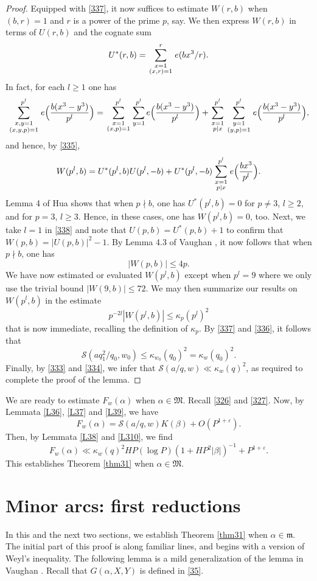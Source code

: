 \documentclass[reqno]{amsart}
\newcommand{\f}[2]{\frac{#1}{#2}}
\newcommand{\multsum}[2]{\sum_{{\scriptstyle #1}\atop {\scriptstyle #2}}}
\numberwithin{equation}{section}
\begin{document}
\begin{proof}
Equipped with \eqref{337}, it now suffices to estimate $W(r,b)$ when $(b,r)=1$ and $r$ is a power of the prime $p$, say. We then express $W(r,b)$ in terms of $U(r,b)$ and the cognate sum
$$ U^*(r,b) = \multsum{x=1}{(x,r)=1}^r e(bx^3/r). $$
In fact, for each $l\ge 1$ one has
$$  \multsum{x,y=1}{(x,y,p)=1}^{p^l} e\Big(\frac{b(x^3-y^3)}{p^l}\Big) = \multsum{x=1}{(x,p)=1}^{p^l} \sum_{y=1}^{p^l} e\Big(\frac{b(x^3-y^3)}{p^l}\Big) + \multsum{x=1}{p\mid x}^{p^l} \multsum{y=1}{(y,p)=1}^{p^l} e\Big(\frac{b(x^3-y^3)}{p^l}\Big), $$
and hence, by \eqref{335},
\begin{equation}\label{338} W(p^l,b) = U^*(p^l,b)U(p^l,-b) +U^*(p^l,-b) \multsum{x=1}{p\mid x}^{p^l}
e\Big(\f{bx^3}{p^l}\Big). \end{equation}
Lemma 4 of Hua \cite{H1} shows that when $p\nmid b$, one has $U^*(p^l,b)=0$ for $p\neq 3$, $l\ge 2$, and for $p=3$, $l\ge 3$. Hence, in these cases, one has $W(p^l,b)=0$, too. 
Next, we take $l=1$ in \eqref{338} and note that $U(p,b) = U^*(p,b)+1$ to confirm that $W(p,b)=|U(p,b)|^2 -1$. By Lemma 4.3 of Vaughan \cite{hlm}, it now follows that when $p\nmid b$, one has
$$ |W(p,b)| \le 4p. $$
We have now estimated or evaluated $W(p^l,b)$ except when $p^l=9$ where we only use the trivial bound $|W(9,b)|\le 72$. We may then summarize our results on $W(p^l,b)$ in the estimate
$$ p^{-2l} |W(p^l,b)| \le \kappa_p(p^l)^2 $$
that is now immediate, recalling the definition of $\kappa_p$. By \eqref{337} and \eqref{336}, it follows that
$$   \mathscr S(aq_1^2/q_0,w_0) \le \kappa_{w_0}(q_0)^2 = \kappa_w(q_0)^2. $$
Finally, by \eqref{333} and \eqref{334}, we infer that
$ \mathscr S(a/q,w) \ll \kappa_w(q)^2$, as required to complete the proof of the lemma.
\end{proof}

We are ready to estimate $F_w(\alpha)$ when $\alpha\in\mathfrak M$. Recall \eqref{326} and \eqref{327}. Now, by Lemmata \ref{L36}, \ref{L37} and \ref{L39}, we have
$$ F_w(\alpha) = \mathscr S(a/q,w)K(\beta) +O(P^{1+\varepsilon}). $$
Then, by Lemmata \ref{L38} and \ref{L310}, we find
$$ F_w(\alpha) \ll \kappa_w(q)^2 HP (\log P) (1+HP^2|\beta|)^{-1} + P^{1+\varepsilon}. $$
This establishes Theorem \ref{thm31} when $\alpha\in \mathfrak M$.




\section{Minor arcs: first reductions}

In this and the next two sections, we establish Theorem \ref{thm31} when \(\alpha \in \mathfrak m\). The initial part of this proof is along familiar lines, and begins with a version of Weyl's inequality. The following lemma is a mild generalization of the lemma in Vaughan \cite{V85}. Recall that \(G(\alpha, X, Y)\) is defined in \eqref{35}.
\end{document}
